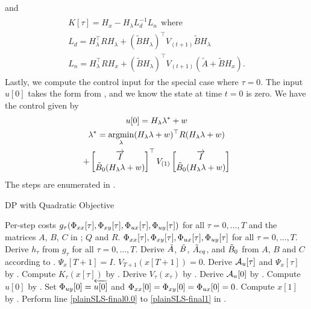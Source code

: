 and
\begin{align}\label{eqn:K_LQ}
    \begin{gathered}
        K[\tau] = H_x - H_{\lambda} L_d^{-1} L_n\ \ \text{where } \\
        L_d = H_{\lambda}^\top  R H_{\lambda} + (\tilde{B} H_{\lambda})^\top  V_{(t+1)} \tilde{B} H_{\lambda} \\
        L_n = H_{\lambda}^\top  R H_x + (\tilde{B} H_{\lambda})^\top  V_{(t+1)} (\tilde{A}+\tilde{B}H_x).
    \end{gathered}
\end{align}
Lastly, we compute the control input for the special case where $\tau = 0$. The input $u[0]$ takes the form 
from , and we know the state at time $t=0$ is zero. We have the control  given by 
\begin{align}\label{eqn:K0_LQ}
    \begin{gathered}
        u[0] = H_{\lambda}\lambda^* + w \\
        \lambda^* = \operatorname*{argmin}_{\lambda} (H_{\lambda}\lambda + w)^\top  R (H_{\lambda}\lambda + w) \\
        + \begin{bmatrix}\overrightarrow{I}\\ \tilde{B}_0(H_{\lambda}\lambda + w)\end{bmatrix}^\top  V_{(1)} \begin{bmatrix}\overrightarrow{I}\\ \tilde{B}_0(H_{\lambda}\lambda + w)\end{bmatrix}
    \end{gathered}
\end{align}
The steps are enumerated in .
\begin{algorithm}
    \caption{DP with Quadratic Objective}
    \label{alg:LQ}
    \begin{algorithmic}[1]
    \REQUIRE Per-step costs $g_{\tau}(\Phi_{xx}[\tau],\Phi_{xy}[\tau],\Phi_{ux}[\tau],\Phi_{uy}[\tau])$ for all $\tau = 0, \dots, T$ and the matrices $A$, $B$, $C$ in ; $Q$ and $R$.
    \ENSURE $\Phi_{xx}[\tau],\Phi_{xy}[\tau],\Phi_{ux}[\tau],\Phi_{uy}[\tau]$ for all $\tau = 0, \dots, T$.
    \STATE Derive $h_\tau$ from $g_{\tau}$ for all $\tau = 0, \dots, T$.
    \STATE Derive $\tilde{A}$, $\tilde{B}$, $\tilde{A}_{eq}$, and $\tilde{B}_0$ from $A$, $B$ and $C$ according to .
    \STATE $\Psi_x[T+1] = I$.
    \STATE $V_{T+1}(x[T+1]) = 0$.
        \STATE Derive $\mathcal{A}_u[\tau]$ and $\Psi_x[\tau]$ by .
        \STATE Compute $K_{\tau}(x[\tau])$ by .
        \STATE Derive $V_{\tau}(x_{\tau})$ by .
    \ENDFOR
    \STATE Derive $\mathcal{A}_u[0]$ by .
    \STATE Compute $u[0]$ by .
	\STATE Set $\Phi_{uy}[0] = \overleftarrow{u[0]}$ and $\Phi_{xx}[0] = \Phi_{xy}[0] = \Phi_{ux}[0] = 0$.
    \STATE Compute $x[1]$ by .
    \STATE Perform line \ref{plainSLS-final0.0} to \ref{plainSLS-final1} in .
    \end{algorithmic}
\end{algorithm}